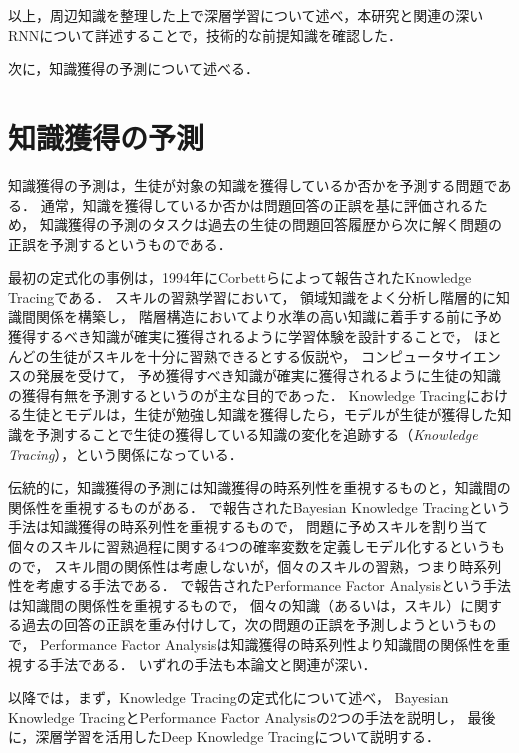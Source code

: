 \vvspace


以上，周辺知識を整理した上で深層学習について述べ，本研究と関連の深いRNNについて詳述することで，技術的な前提知識を確認した．

次に，知識獲得の予測について述べる．



\section{知識獲得の予測}
知識獲得の予測は，生徒が対象の知識を獲得しているか否かを予測する問題である．
通常，知識を獲得しているか否かは問題回答の正誤を基に評価されるため，
知識獲得の予測のタスクは過去の生徒の問題回答履歴から次に解く問題の正誤を予測するというものである．

最初の定式化の事例は，1994年にCorbettらによって報告されたKnowledge Tracing\cite{corbett1994knowledge}である．
スキルの習熟学習において，
領域知識をよく分析し階層的に知識間関係を構築し，
階層構造においてより水準の高い知識に着手する前に予め獲得するべき知識が確実に獲得されるように学習体験を設計することで，
ほとんどの生徒がスキルを十分に習熟できるとする仮説\cite{keller1968good, bloom1968learning}や，
コンピュータサイエンスの発展を受けて，
予め獲得すべき知識が確実に獲得されるように生徒の知識の獲得有無を予測するというのが主な目的であった．
Knowledge Tracingにおける生徒とモデルは，生徒が勉強し知識を獲得したら，モデルが生徒が獲得した知識を予測することで生徒の獲得している知識の変化を追跡する（{\it Knowledge Tracing}），という関係になっている．


伝統的に，知識獲得の予測には知識獲得の時系列性を重視するものと，知識間の関係性を重視するものがある．
\cite{corbett1994knowledge}で報告されたBayesian Knowledge Tracingという手法は知識獲得の時系列性を重視するもので，
問題に予めスキルを割り当て個々のスキルに習熟過程に関する4つの確率変数を定義しモデル化するというもので，
スキル間の関係性は考慮しないが，個々のスキルの習熟，つまり時系列性を考慮する手法である．
\cite{pavlik2009performance}で報告されたPerformance Factor Analysisという手法は知識間の関係性を重視するもので，
個々の知識（あるいは，スキル）に関する過去の回答の正誤を重み付けして，次の問題の正誤を予測しようというもので，
Performance Factor Analysisは知識獲得の時系列性より知識間の関係性を重視する手法である．
いずれの手法も本論文と関連が深い．


以降では，まず，Knowledge Tracingの定式化について述べ，
Bayesian Knowledge TracingとPerformance Factor Analysisの2つの手法を説明し，
最後に，深層学習を活用したDeep Knowledge Tracingについて説明する．


